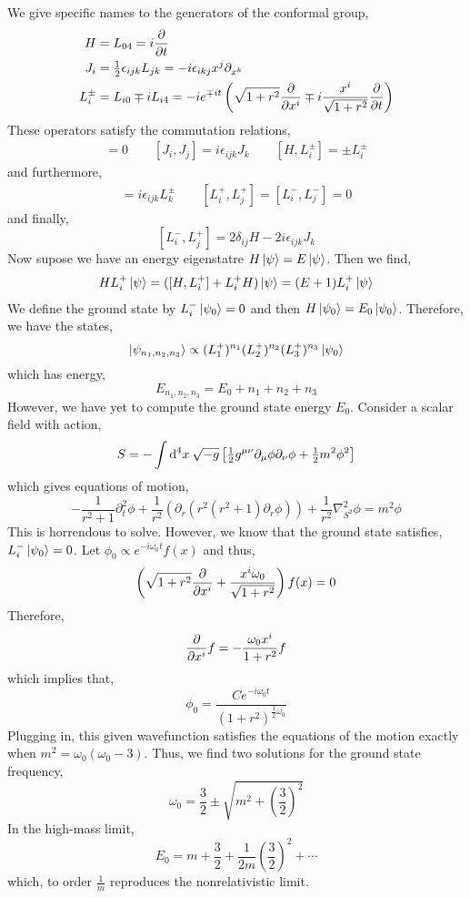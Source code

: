 \documentclass[12pt]{extarticle}
\begin{document}
We give specific names to the generators of the conformal group,
\begin{align*}
H & = L_{04} = i \frac{\partial{}}{\partial{t}} 
\\
J_i & = \tfrac{1}{2} \epsilon_{ijk} L_{jk} = - i \epsilon_{ikj} x^j \partial_{x^k}
\\
L_i^{\pm} & = L_{i0} \mp i L_{i4} = - i e^{\mp i t}  \left( \sqrt{1 + r^2} \frac{\partial{}}{\partial{x^i}} \mp i \frac{x^i}{\sqrt{1 + r^2}} \frac{\partial{}}{\partial{t}} \right)
\end{align*}
These operators satisfy the commutation relations,
\begin{align*}
[H, J_i] = 0 \quad \quad [J_i, J_j] = i \epsilon_{ijk} J_k \quad \quad [H, L_i^{\pm}] = \pm L_i^{\pm} 
\end{align*}
and furthermore,
\begin{align*}
[Ji, L_j^{\pm}] = i \epsilon_{ijk} L_k^{\pm} \quad \quad [L_i^{+}, L_j^{+}] = [L_i^{-}, L_j^{-}] = 0 
\end{align*}
and finally,
\[ [L_i^{-}, L_j^{+}] = 2 \delta_{ij} H - 2 i \epsilon_{ijk} J_k \]
Now supose we have an energy eigenstatre $H \left| \psi \right> = E \left| \psi \right>$. Then we find,
\begin{align*}
H L_i^{+} \left| \psi \right> = ( [ H, L_i^{+}] + L_i^{+} H) \left| \psi \right> = (E + 1) L_i^{+} \left| \psi \right> 
\end{align*}
We define the ground state by $L_i^{-} \left| \psi_0 \right> = 0$ and then $H \left| \psi_0 \right> = E_0 \left| \psi_0 \right>$. Therefore, we have the states,
\[ \left| \psi_{n_1, n_2, n_3} \right> \propto (L_1^+)^{n_1} (L_2^+)^{n_2} (L_3^+)^{n_3} \left| \psi_0 \right> \]
which has energy,
\[ E_{n_1, n_2, n_3} = E_0 + n_1 + n_2 + n_3 \]
However, we have yet to compute the ground state energy $E_0$. Consider a scalar field with action,
\[ S = - \int \mathrm{d}^{4} x \: \sqrt{-g} \left[ \tfrac{1}{2} g^{\mu \nu} \partial_\mu \phi \partial_\nu \phi + \tfrac{1}{2} m^2 \phi^2 \right] \]
which gives equations of motion,
\[ - \frac{1}{r^2 + 1} \partial_t^2 \phi + \frac{1}{r^2} ( \partial_r (r^2(r^2 + 1) \partial_r \phi)) + \frac{1}{r^2} \nabla_{S^2}^2 \phi = m^2 \phi \]
This is horrendous to solve. However, we know that the ground state satisfies, $L_i^{-} \left| \psi_0 \right> = 0$. Let $\phi_0 \propto e^{- i \omega_0 t} f(x)$ and thus,
\[ \left( \sqrt{1 + r^2} \frac{\partial{}}{\partial{x^i}} + \frac{x^i \omega_0}{\sqrt{1 + r^2}} \right) f(x) = 0 \]
Therefore, 
\[ \frac{\partial{}}{\partial{x^i}} f = - \frac{\omega_0 x^i}{1 + r^2} f \]
which implies that,
\[ \phi_0 = \frac{C e^{- i \omega_0 t}}{(1 + r^2)^{\frac{1}{2} \omega_0}} \]
Plugging in, this given wavefunction satisfies the equations of the motion exactly when $m^2 = \omega_0 ( \omega_0 - 3)$. Thus, we find two solutions for the ground state frequency,
\[ \omega_0 = \frac{3}{2} \pm \sqrt{m^2 + \left( \frac{3}{2} \right)^2} \]
In the high-mass limit,
\[ E_0 = m + \frac{3}{2} + \frac{1}{2 m} \left( \frac{3}{2} \right)^2 + \cdots \]
which, to order $\frac{1}{m}$ reproduces the nonrelativistic limit. 
\end{document}
